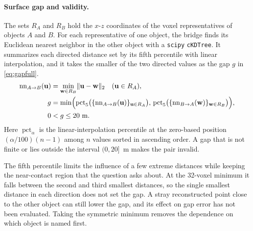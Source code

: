 \documentclass{article}
\newcommand{\bu}{\mathbf{u}}
\newcommand{\bw}{\mathbf{w}}
\begin{document}
\paragraph{Surface gap and validity.}
The sets $R_A$ and $R_B$ hold the $x$-$z$ coordinates of the voxel representatives of objects $A$ and $B$. For each representative of one object, the bridge finds its Euclidean nearest neighbor in the other object with a \texttt{scipy} \texttt{cKDTree}. It summarizes each directed distance set by its fifth percentile with linear interpolation, and it takes the smaller of the two directed values as the gap $g$ in \cref{eq:gapfull}.
\begin{align}
  \operatorname{nn}_{A \to B}(\bu) &= \min_{\bw \in R_B} \lVert \bu - \bw \rVert_2 \quad (\bu \in R_A), \notag\\
  g &= \min\Bigl(\operatorname{pct}_{5}\bigl(\{\operatorname{nn}_{A \to B}(\bu)\}_{\bu \in R_A}\bigr),\, \operatorname{pct}_{5}\bigl(\{\operatorname{nn}_{B \to A}(\bw)\}_{\bw \in R_B}\bigr)\Bigr), \notag\\
  0 &< g \le 20\ \text{m}. \label{eq:gapfull}
\end{align}
Here $\operatorname{pct}_{\alpha}$ is the linear-interpolation percentile at the zero-based position $(\alpha/100)(n-1)$ among $n$ values sorted in ascending order. A gap that is not finite or lies outside the interval $(0, 20]$~m makes the pair invalid.

The fifth percentile limits the influence of a few extreme distances while keeping the near-contact region that the question asks about. At the 32-voxel minimum it falls between the second and third smallest distances, so the single smallest distance in each direction does not set the gap. A stray reconstructed point close to the other object can still lower the gap, and its effect on gap error has not been evaluated. Taking the symmetric minimum removes the dependence on which object is named first.
\end{document}
